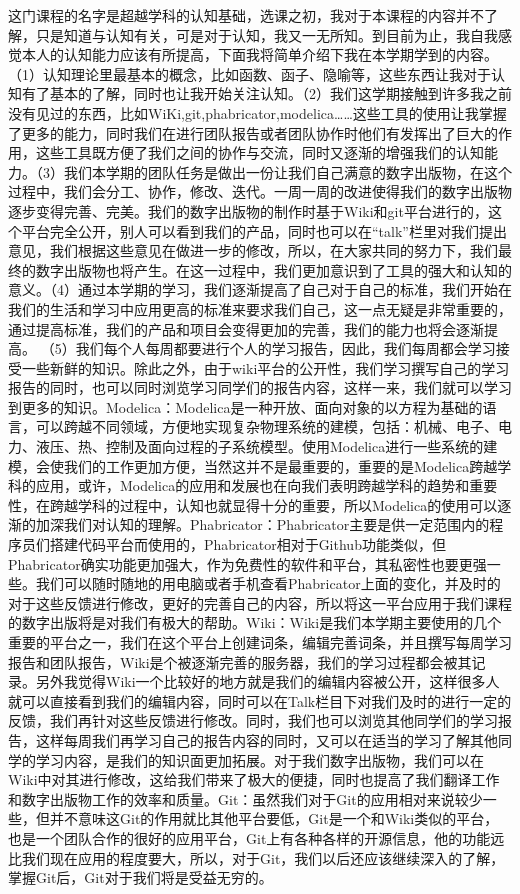 \documentclass[11pt,fleqn]{book}
\numberwithin{dummy}{section}
\theoremstyle{ocrenumbox}
\theoremstyle{blacknumex}
\theoremstyle{blacknumbox}
\theoremstyle{ocrenum}
\newenvironment{remark}[1]{\par\vspace{10pt}\small %
	\begin{list}{}{
			\leftmargin=35pt %
			\rightmargin=25pt}\item\ignorespaces %
		\makebox[-2.5pt]{\begin{tikzpicture}[overlay]
			\node[draw=ocre!60,line width=1pt,circle,fill=ocre!25,font=\sffamily\bfseries,inner sep=2pt,outer sep=0pt] at (-15pt,0pt){\textcolor{ocre}{#1}};\end{tikzpicture}} %
		\advance\baselineskip -1pt}{\end{list}\vskip5pt} %
\newlength\esp
\begin{document}
\begin{remark}{张}
	这门课程的名字是超越学科的认知基础，选课之初，我对于本课程的内容并不了解，只是知道与认知有关，可是对于认知，我又一无所知。到目前为止，我自我感觉本人的认知能力应该有所提高，下面我将简单介绍下我在本学期学到的内容。（1）认知理论里最基本的概念，比如函数、函子、隐喻等，这些东西让我对于认知有了基本的了解，同时也让我开始关注认知。（2）我们这学期接触到许多我之前没有见过的东西，比如WiKi,git,phabricator,modelica……这些工具的使用让我掌握了更多的能力，同时我们在进行团队报告或者团队协作时他们有发挥出了巨大的作用，这些工具既方便了我们之间的协作与交流，同时又逐渐的增强我们的认知能力。（3）我们本学期的团队任务是做出一份让我们自己满意的数字出版物，在这个过程中，我们会分工、协作，修改、迭代。一周一周的改进使得我们的数字出版物逐步变得完善、完美。我们的数字出版物的制作时基于Wiki和git平台进行的，这个平台完全公开，别人可以看到我们的产品，同时也可以在“talk”栏里对我们提出意见，我们根据这些意见在做进一步的修改，所以，在大家共同的努力下，我们最终的数字出版物也将产生。在这一过程中，我们更加意识到了工具的强大和认知的意义。（4）通过本学期的学习，我们逐渐提高了自己对于自己的标准，我们开始在我们的生活和学习中应用更高的标准来要求我们自己，这一点无疑是非常重要的，通过提高标准，我们的产品和项目会变得更加的完善，我们的能力也将会逐渐提高。	（5）我们每个人每周都要进行个人的学习报告，因此，我们每周都会学习接受一些新鲜的知识。除此之外，由于wiki平台的公开性，我们学习撰写自己的学习报告的同时，也可以同时浏览学习同学们的报告内容，这样一来，我们就可以学习到更多的知识。Modelica：Modelica是一种开放、面向对象的以方程为基础的语言，可以跨越不同领域，方便地实现复杂物理系统的建模，包括：机械、电子、电力、液压、热、控制及面向过程的子系统模型。使用Modelica进行一些系统的建模，会使我们的工作更加方便，当然这并不是最重要的，重要的是Modelica跨越学科的应用，或许，Modelica的应用和发展也在向我们表明跨越学科的趋势和重要性，在跨越学科的过程中，认知也就显得十分的重要，所以Modelica的使用可以逐渐的加深我们对认知的理解。Phabricator：Phabricator主要是供一定范围内的程序员们搭建代码平台而使用的，Phabricator相对于Github功能类似，但Phabricator确实功能更加强大，作为免费性的软件和平台，其私密性也要更强一些。我们可以随时随地的用电脑或者手机查看Phabricator上面的变化，并及时的对于这些反馈进行修改，更好的完善自己的内容，所以将这一平台应用于我们课程的数字出版将是对我们有极大的帮助。Wiki：Wiki是我们本学期主要使用的几个重要的平台之一，我们在这个平台上创建词条，编辑完善词条，并且撰写每周学习报告和团队报告，Wiki是个被逐渐完善的服务器，我们的学习过程都会被其记录。另外我觉得Wiki一个比较好的地方就是我们的编辑内容被公开，这样很多人就可以直接看到我们的编辑内容，同时可以在Talk栏目下对我们及时的进行一定的反馈，我们再针对这些反馈进行修改。同时，我们也可以浏览其他同学们的学习报告，这样每周我们再学习自己的报告内容的同时，又可以在适当的学习了解其他同学的学习内容，是我们的知识面更加拓展。对于我们数字出版物，我们可以在Wiki中对其进行修改，这给我们带来了极大的便捷，同时也提高了我们翻译工作和数字出版物工作的效率和质量。Git：虽然我们对于Git的应用相对来说较少一些，但并不意味这Git的作用就比其他平台要低，Git是一个和Wiki类似的平台，也是一个团队合作的很好的应用平台，Git上有各种各样的开源信息，他的功能远比我们现在应用的程度要大，所以，对于Git，我们以后还应该继续深入的了解，掌握Git后，Git对于我们将是受益无穷的。
\end{remark}
\end{document}
